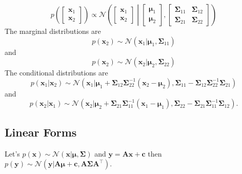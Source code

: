 \begin{equation} \label{eq:jointPro_x1_x2}
p\left(\begin{bmatrix}  \textbf{x}_1 \\\textbf{x}_2 \end{bmatrix} \right) \propto
\mathcal{N}\left( \begin{bmatrix} \textbf{x}_1 \\\textbf{x}_2 \end{bmatrix} \middle|
\begin{bmatrix} \boldsymbol{\mu}_1 \\\boldsymbol{\mu}_2 \end{bmatrix}, \begin{bmatrix} \boldsymbol{\Sigma}_{11} & \boldsymbol{\Sigma}_{12} \\
\boldsymbol{\Sigma}_{21} & \boldsymbol{\Sigma}_{22} \end{bmatrix} \right)
\end{equation}
The marginal distributions are 
\begin{equation}\label{marginal_x1}
p\left(\textbf{x}_2\right)\sim\mathcal{N}\left(\textbf{x}_1|\boldsymbol{\mu}_1,\boldsymbol{\Sigma}_{11}\right)
\end{equation}
and
\begin{equation}\label{marginal_x2}
p\left(\textbf{x}_2\right)\sim\mathcal{N}\left(\textbf{x}_2|\boldsymbol{\mu}_2,\boldsymbol{\Sigma}_{22}\right)
\end{equation}
The conditional distributions are
\begin{equation}\label{cond_x1}
p\left(\textbf{x}_1|\textbf{x}_2\right)\sim\mathcal{N}\left(\textbf{x}_1|\boldsymbol{\mu}_1+\boldsymbol{\Sigma}_{12}\boldsymbol{\Sigma}_{22}^{-1}\left(\textbf{x}_2-\boldsymbol{\mu}_2\right),\boldsymbol{\Sigma}_{11}-\boldsymbol{\Sigma}_{12}\boldsymbol{\Sigma}_{22}^{-1}\boldsymbol{\Sigma}_{21}\right)
\end{equation}
and
\begin{equation}\label{cond_x2}
p\left(\textbf{x}_2|\textbf{x}_1\right)\sim\mathcal{N}\left(\textbf{x}_2|\boldsymbol{\mu}_2+\boldsymbol{\Sigma}_{21}\boldsymbol{\Sigma}_{11}^{-1}\left(\textbf{x}_1-\boldsymbol{\mu}_1\right),\boldsymbol{\Sigma}_{22}-\boldsymbol{\Sigma}_{21}\boldsymbol{\Sigma}_{11}^{-1}\boldsymbol{\Sigma}_{12}\right).
\end{equation}

\subsection{Linear Forms}
Let's $p\left(\textbf{x}\right)\sim\mathcal{N}\left(\textbf{x}|\boldsymbol{\mu},\boldsymbol{\Sigma}\right)$ and $\textbf{y}=\textbf{A}\textbf{x}+\textbf{c}$ then $p\left(\textbf{y}\right)\sim\mathcal{N}\left(\textbf{y}|\textbf{A}\boldsymbol{\mu}+\textbf{c},\textbf{A}\boldsymbol{\Sigma}\textbf{A}^\top\right)$. 

